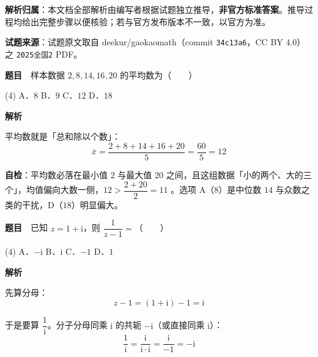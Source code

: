 

\begin{gknotice}
\textbf{解析归属}：本文档全部解析由编写者根据试题独立推导，\textbf{非官方标准答案}。推导过程均给出完整步骤以便核验；若与官方发布版本不一致，以官方为准。

\textbf{试题来源}：试题原文取自 deekur/gaokaomath（commit \texttt{34c13a6}，CC BY 4.0）之 \texttt{2025全国2} PDF。
\end{gknotice}

\par\medskip



\textbf{题目}　样本数据 $2,8,14,16,20$ 的平均数为（　　）

\begin{gkopts}(4)
\task A．$8$
\task B．$9$
\task C．$12$
\task D．$18$
\end{gkopts}

\textbf{解析}

平均数就是「总和除以个数」：
\[\bar x=\frac{2+8+14+16+20}{5}=\frac{60}{5}=12\]


\begin{gktip}
\textbf{自检}：平均数必落在最小值 $2$ 与最大值 $20$ 之间，且这组数据「小的两个、大的三个」，均值偏向大数一侧，$12>\dfrac{2+20}{2}=11$ 。选项 A（$8$）是中位数 $14$ 与众数之类的干扰，D（$18$）明显偏大。
\end{gktip}

\par\medskip


\textbf{题目}　已知 $z=1+\mathrm{i}$，则 $\dfrac{1}{z-1}=$（　　）

\begin{gkopts}(4)
\task A．$-\mathrm{i}$
\task B．$\mathrm{i}$
\task C．$-1$
\task D．$1$
\end{gkopts}

\textbf{解析}

先算分母：
\[z-1=(1+\mathrm{i})-1=\mathrm{i}\]

于是要算 $\dfrac1{\mathrm{i}}$。分子分母同乘 $\mathrm{i}$ 的共轭 $-\mathrm{i}$（或直接同乘 $\mathrm{i}$）：
\[\frac1{\mathrm{i}}=\frac{\mathrm{i}}{\mathrm{i}\cdot\mathrm{i}}=\frac{\mathrm{i}}{-1}=-\mathrm{i}\]



